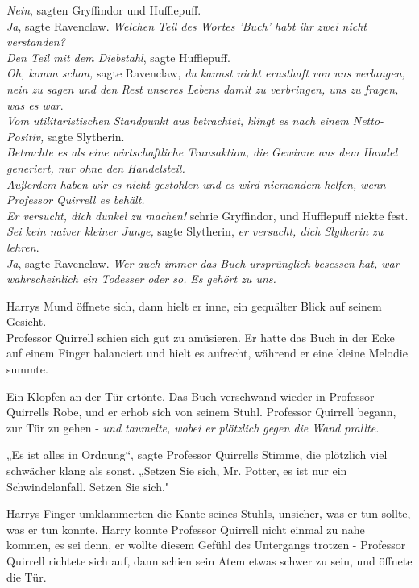 {\emph{Nein}, sagten Gryffindor und Hufflepuff.\\ \emph{Ja}, sagte Ravenclaw. \emph{Welchen Teil des Wortes 'Buch' habt ihr zwei nicht verstanden?}\\ \emph{Den Teil mit dem Diebstahl}, sagte Hufflepuff.\\ \emph{Oh, komm schon,} sagte Ravenclaw, \emph{du kannst nicht ernsthaft von uns verlangen, nein zu sagen und den Rest unseres Lebens damit zu verbringen, uns zu fragen, was es war}.\\ \emph{Vom utilitaristischen Standpunkt aus betrachtet, klingt es nach einem Netto-Positiv,} sagte Slytherin.\\ \emph{Betrachte es als eine wirtschaftliche Transaktion, die Gewinne aus dem Handel generiert, nur ohne den Handelsteil.\\ Außerdem haben wir es nicht gestohlen und es wird niemandem helfen, wenn Professor Quirrell es behält.}\\ \emph{Er versucht, dich dunkel zu machen!} schrie Gryffindor, und Hufflepuff nickte fest.\\ \emph{Sei kein naiver kleiner Junge,} sagte Slytherin, \emph{er versucht, dich Slytherin zu lehren}.\\ \emph{Ja}, sagte Ravenclaw. \emph{Wer auch immer das Buch ursprünglich besessen hat, war wahrscheinlich ein Todesser oder so.} \emph{Es gehört zu uns.}

Harrys Mund öffnete sich, dann hielt er inne, ein gequälter Blick auf seinem Gesicht.\\ Professor Quirrell schien sich gut zu amüsieren. Er hatte das Buch in der Ecke auf einem Finger balanciert und hielt es aufrecht, während er eine kleine Melodie summte.

Ein Klopfen an der Tür ertönte. Das Buch verschwand wieder in Professor Quirrells Robe, und er erhob sich von seinem Stuhl. Professor Quirrell begann, zur Tür zu gehen - \emph{und taumelte, wobei er plötzlich gegen die Wand prallte.}

„Es ist alles in Ordnung“, sagte Professor Quirrells Stimme, die plötzlich viel schwächer klang als sonst. „Setzen Sie sich, Mr. Potter, es ist nur ein Schwindelanfall. Setzen Sie sich."

Harrys Finger umklammerten die Kante seines Stuhls, unsicher, was er tun sollte, was er tun konnte. Harry konnte Professor Quirrell nicht einmal zu nahe kommen, es sei denn, er wollte diesem Gefühl des Untergangs trotzen - Professor Quirrell richtete sich auf, dann schien sein Atem etwas schwer zu sein, und öffnete die Tür.

}

